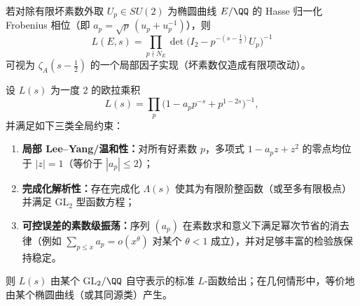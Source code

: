 \begin{remark}[椭圆曲线局部因子的实例化]\label{rem:operator-singular-boundary-elliptic-local-factor}
若对除有限坏素数外取 \(U_p\in SU(2)\) 为椭圆曲线 \(E/\QQ\) 的 Hasse 归一化 Frobenius 相位（即 \(a_p=\sqrt p\,(u_p+u_p^{-1})\)），则
\[
L(E,s)=\prod_{p\nmid N_E}\det\bigl(I_2-p^{-(s-\frac12)}U_p\bigr)^{-1}
\]
可视为 \(\zeta_A(s-\tfrac12)\) 的一个局部因子实现（坏素数仅造成有限项改动）。
\end{remark}

\begin{conjecture}\label{conj:operator-leyang-error-control-automorphy-rigidity}
设 \(L(s)\) 为一度 \(2\) 的欧拉乘积
\[
L(s)=\prod_p\bigl(1-a_p p^{-s}+p^{1-2s}\bigr)^{-1},
\]
并满足如下三类全局约束：
\begin{enumerate}
  \item \textbf{局部 Lee--Yang/温和性：}对所有好素数 \(p\)，多项式 \(1-a_p z+z^2\) 的零点均位于 \(|z|=1\)（等价于 \(|a_p|\le 2\)）；
  \item \textbf{完成化解析性：}存在完成化 \(\Lambda(s)\) 使其为有限阶整函数（或至多有限极点）并满足 GL\(_2\) 型函数方程；
  \item \textbf{可控误差的素数级振荡：}序列 \((a_p)\) 在素数求和意义下满足幂次节省的消去律（例如 \(\sum_{p\le x}a_p=o(x^\theta)\) 对某个 \(\theta<1\) 成立），并对足够丰富的检验族保持稳定。
\end{enumerate}
则 \(L(s)\) 由某个 GL\(_2/\QQ\) 自守表示的标准 \(L\)-函数给出；在几何情形中，等价地由某个椭圆曲线（或其同源类）产生。
\end{conjecture}

\endinput
